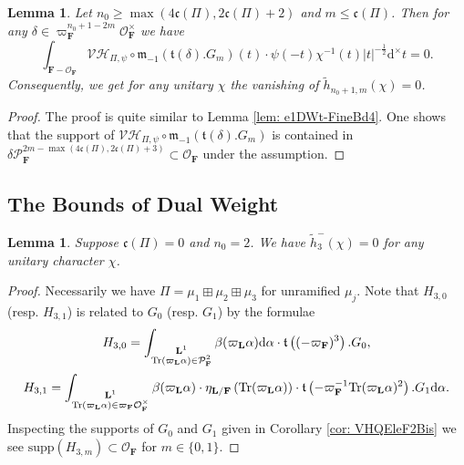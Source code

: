 \documentclass[A4]{amsart}
\def\leq{\leqslant}
\def\geq{\geqslant}
\newtheorem{lemma}      [theorem]{Lemma}
\numberwithin{equation}{section} \everymath{\displaystyle}
\newcommand{\Tr}{{\rm Tr}}
\newcommand{\ud}{\mathrm{d}}
\newcommand{\F}{\mathbf{F}}
\newcommand{\bL}{\mathbf{L}}
\newcommand{\vO}{\mathcal{O}}
\newcommand{\vP}{\mathcal{P}}
\newcommand{\norm}[1][\cdot]{\lvert #1 \rvert}
\newcommand{\Mult}{\mathfrak{m}}
\newcommand{\VorH}{\mathcal{VH}}
\newcommand{\Trans}{\mathfrak{t}}
\newcommand{\cond}{\mathfrak{c}}
\begin{document}
\begin{lemma} \label{lem: e2DWt-FineBd3}
	Let $n_0 \geq \max(4\cond(\Pi), 2\cond(\Pi)+2)$ and $m \leq \cond(\Pi)$. Then for any $\delta \in \varpi_{\F}^{n_0+1-2m}\vO_{\F}^{\times}$ we have
	$$ \int_{\F-\vO_{\F}} \VorH_{\Pi,\psi} \circ \Mult_{-1} \left( \Trans(\delta).G_m \right)(t) \cdot \psi(-t)\chi^{-1}(t)\norm[t]^{-\frac{1}{2}} \ud^{\times} t = 0. $$
	Consequently, we get for any unitary $\chi$ the vanishing of $\widetilde{h}_{n_0+1,m}(\chi) = 0$.
\end{lemma}
\begin{proof}
	The proof is quite similar to Lemma \ref{lem: e1DWt-FineBd4}. One shows that the support of $\VorH_{\Pi,\psi} \circ \Mult_{-1} \left( \Trans(\delta).G_m \right)$ is contained in $\delta \vP_{\F}^{2m-\max(4\cond(\Pi), 2\cond(\Pi)+3)} \subset \vO_{\F}$ under the assumption.
\end{proof}
	
	
	\subsection{The Bounds of Dual Weight}
	
\begin{lemma} \label{lem: h2-Bdn0=2}
	Suppose $\cond(\Pi)=0$ and $n_0=2$. We have $\widetilde{h}_3^-(\chi) = 0$ for any unitary character $\chi$.
\end{lemma}
\begin{proof}
	Necessarily we have $\Pi = \mu_1 \boxplus \mu_2 \boxplus \mu_3$ for unramified $\mu_j$. Note that $H_{3,0}$ (resp. $H_{3,1}$) is related to $G_0$ (resp. $G_1$) by the formulae
	$$ H_{3,0} = \int_{\substack{\bL^1 \\ \Tr(\varpi_{\bL} \alpha) \in \vP_{\F}^{2}}} \beta(\varpi_{\bL} \alpha) \ud \alpha \cdot \Trans \left( (-\varpi_{\F})^{3} \right).G_0, $$
	$$ H_{3,1} = \int_{\substack{\bL^1 \\ \Tr(\varpi_{\bL} \alpha) \in \varpi_{\F} \vO_{\F}^{\times}}} \beta(\varpi_{\bL} \alpha) \cdot \eta_{\bL/\F} \left( \Tr(\varpi_{\bL}\alpha) \right) \cdot \Trans \left( -\varpi_{\F}^{-1} \Tr(\varpi_{\bL} \alpha)^2 \right).G_1 \ud \alpha. $$
	Inspecting the supports of $G_0$ and $G_1$ given in Corollary \ref{cor: VHQEleF2Bis} we see $\mathrm{supp}(H_{3,m}) \subset \vO_{\F}$ for $m \in \{ 0,1 \}$.
\end{proof}
\end{document}

